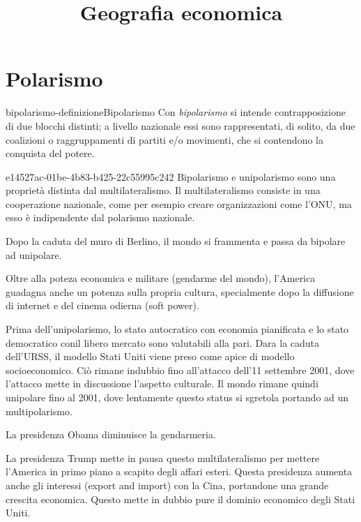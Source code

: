 \documentclass[preview]{standalone}
\begin{document}
\title{Geografia economica}
\genpage

\section{Polarismo}

\begin{snippetdefinition}{bipolarismo-definizione}{Bipolarismo}
    Con \textit{bipolarismo} si intende contrapposizione di due blocchi distinti;
    a livello nazionale essi sono rappresentati, di solito, da due coalizioni o
    raggruppamenti di partiti e/o movimenti, che si contendono la conquista del potere.
\end{snippetdefinition}

\begin{snippet}{e14527ac-01be-4b83-b425-22c55995c242}
    Bipolarismo e unipolarismo sono una proprietà distinta dal multilateralismo.
    Il multilateralismo consiste in una cooperazione nazionale, come per esempio creare organizzazioni
    come l'ONU, ma esso è indipendente dal polarismo nazionale.

    Dopo la caduta del muro di Berlino, il mondo si frammenta e passa da bipolare ad unipolare.

    Oltre alla poteza economica e militare (gendarme del mondo), l'America
    guadagna anche un potenza sulla propria cultura, specialmente dopo la diffusione di internet
    e del cinema odierna (soft power).

    Prima dell'unipolarismo, lo stato autocratico con economia pianificata e
    lo stato democratico conil libero mercato sono valutabili alla pari.
    Dara la caduta dell'URSS, il modello Stati Uniti viene preso come apice
    di modello socioeconomico.
    Ciò rimane indubbio fino all'attacco dell'11 settembre 2001, dove l'attacco mette
    in discussione l'aspetto culturale.
    Il mondo rimane quindi unipolare fino al 2001, dove lentamente questo status si sgretola
    portando ad un multipolarismo.

    La presidenza Obama diminuisce la gendarmeria.

    La presidenza Trump mette in pausa questo multilateralismo per mettere l'America
    in primo piano a scapito degli affari esteri.
    Questa presidenza aumenta anche gli interessi (export and import) con la Cina, portandone
    una grande crescita economica. Questo mette in dubbio pure
    il dominio economico degli Stati Uniti.
\end{snippet}
\end{document}
